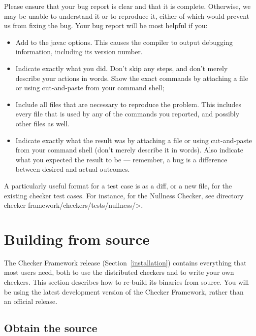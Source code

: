 Please ensure that your bug report is clear and that it is complete.
Otherwise, we may be unable to understand it or to reproduce it, either of
which would prevent us from fixing the bug.  Your bug report will be most
helpful if you:

\begin{itemize}
\item
  Add  to the javac options.  This causes the compiler to output
  debugging information, including its version number.
\item
  Indicate exactly what you did.  Don't skip any steps, and don't merely
  describe your actions in words.  Show the exact commands by attaching a
  file or using cut-and-paste from your command shell;
\item
  Include all files that are necessary to reproduce the problem.  This
  includes every file that is used by any of the commands you reported, and
  possibly other files as well.
\item
  Indicate exactly what the result was by attaching a file or using
  cut-and-paste from your command shell (don't merely describe it in
  words).  Also indicate what you expected the result to be --- remember, a
  bug is a difference between desired and actual outcomes.
\end{itemize}

A particularly useful format for a test case is as a diff, or a new file,
for the existing checker test cases.  For instance, for the Nullness
Checker, see directory \<checker-framework/checkers/tests/nullness/>.


\section{Building from source\label{build-source}}

The Checker Framework release (Section~\ref{installation}) contains
everything that most users need, both to use the distributed checkers and
to write your own checkers.  This section describes how to re-build its
binaries from source.  You will be using the latest development version of
the Checker Framework, rather than an official release.



\subsection{Obtain the source}


